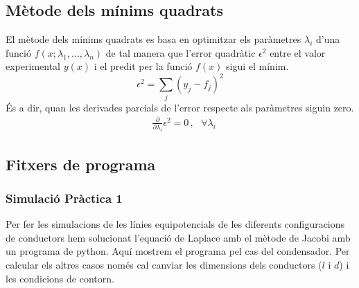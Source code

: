 \documentclass[11pt]{article}
\numberwithin{equation}{section}
\numberwithin{figure}{section}
\numberwithin{table}{section}
\begin{document}
\subsection{Mètode dels mínims quadrats} \label{sec: mínims_quadrats}

El mètode dels mínims quadrats es basa en optimitzar els paràmetres $\lambda_i$ d'una funció $f(x;\lambda_1,...,\lambda_n)$ de tal manera que l'error quadràtic $\epsilon^2$ entre el valor experimental $y(x)$ i el predit per la funció $f(x)$ sigui el mínim.
\begin{equation}
    \epsilon^2 = \sum_j(y_j-f_j)^2
\end{equation}
És a dir, quan les derivades parcials de l'error respecte als paràmetres siguin zero.
\begin{align}
     & \frac{\partial}{\partial\lambda_i}\epsilon^2 = 0 \, , \,\,\,\, \forall \lambda_i
\end{align}

\subsection{Fitxers de programa}
\subsubsection{Simulació Pràctica 1}\label{sec: python}
Per fer les simulacions de les línies equipotencials de les diferents configuracions de conductors hem solucionat l'equació de Laplace amb el mètode de Jacobi amb un programa de python. Aquí mostrem el programa pel cas del condensador. Per calcular els altres casos només cal canviar les dimensions dels conductors ($l$ i $d$) i les condicions de contorn.
\end{document}
